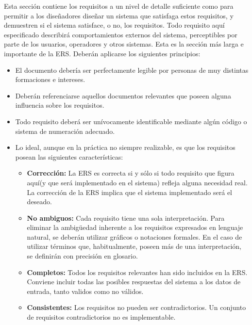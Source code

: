 \documentclass[12pt,a4paper, twosite]{article}
\begin{document}
Esta sección contiene los requisitos a un nivel de detalle suficiente
como para permitir a los diseñadores diseñar un sistema que
satisfaga estos requisitos, y demuestren si el sistema satisface, o
no, los requisitos. Todo requisito aquí especificado describirá
comportamientos externos del sistema, perceptibles por parte de los
usuarios, operadores y otros sistemas. Esta es la sección más larga
e importante de la ERS. Deberán aplicarse los siguientes principios:

\begin{itemize}
\item El documento debería ser perfectamente legible por personas de muy
distintas formaciones e intereses.

\item Deberán referenciarse aquellos documentos relevantes que poseen
alguna influencia sobre los requisitos.

\item Todo requisito deberá ser unívocamente identificable mediante algún
código o sistema de numeración adecuado.

\item Lo ideal, aunque en la práctica no siempre realizable, es que los
requisitos posean las siguientes características: 

\begin{itemize}
\item \textbf{Corrección:} La ERS es correcta si y sólo si todo requisito que
figura aquí(y que será implementado en el sistema) refleja alguna
necesidad real. La corrección de la ERS implica que el sistema
implementado será el deseado.

\item \textbf{No ambiguos:} Cada requisito tiene una sola interpretación. Para
eliminar la ambigüedad inherente a los requisitos expresados en
lenguaje natural, se deberán utilizar gráficos o notaciones
formales. En el caso de utilizar términos que, habitualmente,
poseen más de una interpretación, se definirán con precisión en
glosario.

\item \textbf{Completos:} Todos los requisitos relevantes han sido incluidos en
la ERS. Conviene incluir todas las posibles respuestas del sistema
a los datos de entrada, tanto validos como no válidos.

\item \textbf{Consistentes:} Los requisitos no pueden ser contradictorios. Un
conjunto de requisitos contradictorios no es implementable.


\end{itemize}
\end{itemize}
\end{document}
